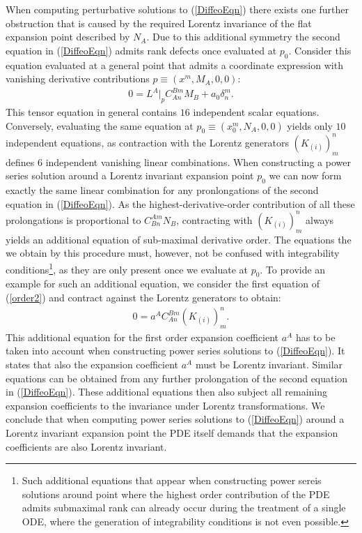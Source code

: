 \documentclass[%
 reprint,
nofootinbib,
 amsmath,amssymb,
 aps,
 prd,
floatfix,
]{revtex4-2}
\begin{document}
When computing perturbative solutions to (\ref{DiffeoEqn})  there exists one further obstruction that is caused by the required Lorentz invariance of the flat expansion point described by $N_A$. Due to this additional symmetry the second equation in (\ref{DiffeoEqn}) admits rank defects once evaluated at $p_0$. Consider this equation evaluated at a general point that admits a coordinate expression with vanishing derivative contributions $p \equiv (x^m,M_A,0,0)$:
\begin{align}
0 = L^A \big \vert_{p} C_{An}^{Bm}M_B + a_0 \delta^m_n.
\end{align}
This tensor equation in general contains $16$ independent scalar equations. Conversely, evaluating the same equation at $p_0\equiv (x_0^m, N_A,0,0)$ yields only $10$ independent equations, as contraction with the Lorentz generators $(K_{(i)})^n_m$ defines $6$ independent vanishing linear combinations.
When constructing a power series solution around a Lorentz invariant expansion point $p_0$ we can now form exactly the same linear combination for any pronlongations of the second equation in (\ref{DiffeoEqn}). As the highest-derivative-order contribution of all these prolongations is proportional to $C^{Am}_{Bn}N_B$, contracting with $(K_{(i)})^n_m$ always yields an additional equation of sub-maximal derivative order. The equations the we obtain by this procedure must, however, not be confused with integrability conditions\footnote{Such additional equations that appear when constructing power sereis solutions around point where the highest order contribution of the PDE admits submaximal rank can already occur during the treatment of a single ODE, where the generation of integrability conditions is not even possible.}, as they are only present once we evaluate at $p_0$. To provide an example for such an additional equation, we consider the first equation of (\ref{order2}) and contract against the Lorentz generators to obtain:
\begin{align}\label{ansatz1}
    0 = a^A C^{Bm}_{An}  (K_{(i)})^n_m.
\end{align}
This additional equation for the first order expansion coefficient $a^A$ has to be taken into account when constructing power series solutions to (\ref{DiffeoEqn}).
It states that also the expansion coefficient $a^A$ must be Lorentz invariant. 
Similar equations can be obtained from any further prolongation of the second equation in (\ref{DiffeoEqn}). These additional equations then also subject all remaining expansion coefficients to the invariance under Lorentz transformations.
We conclude that when computing power series solutions to (\ref{DiffeoEqn}) around a Lorentz invariant expansion point the PDE itself demands that the expansion coefficients are also Lorentz invariant.
\end{document}
